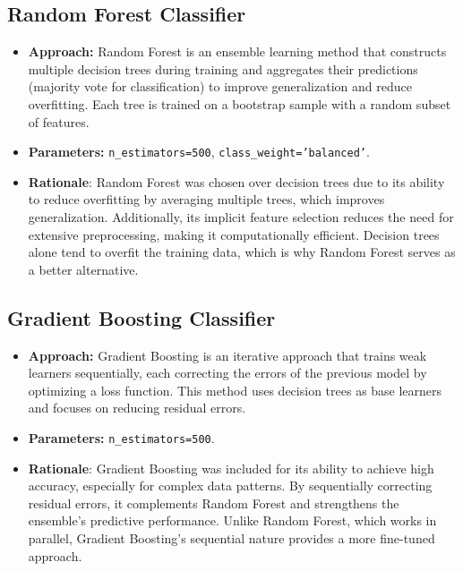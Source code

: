 \documentclass{article}
\begin{document}
\subsection{Random Forest Classifier}
\begin{itemize}
    \item \textbf{Approach:} Random Forest is an ensemble learning method that constructs multiple decision trees during training and aggregates their predictions (majority vote for classification) to improve generalization and reduce overfitting. Each tree is trained on a bootstrap sample with a random subset of features.
    \item \textbf{Parameters:} \texttt{n\_estimators=500}, \texttt{class\_weight='balanced'}.
    \item \textbf{Rationale}: Random Forest was chosen over decision trees due to its ability to reduce overfitting by averaging multiple trees, which improves generalization. Additionally, its implicit feature selection reduces the need for extensive preprocessing, making it computationally efficient. Decision trees alone tend to overfit the training data, which is why Random Forest serves as a better alternative.
\end{itemize}

\subsection{Gradient Boosting Classifier}
\begin{itemize}
    \item \textbf{Approach:} Gradient Boosting is an iterative approach that trains weak learners sequentially, each correcting the errors of the previous model by optimizing a loss function. This method uses decision trees as base learners and focuses on reducing residual errors.
    \item \textbf{Parameters:} \texttt{n\_estimators=500}.
    \item \textbf{Rationale}: Gradient Boosting was included for its ability to achieve high accuracy, especially for complex data patterns. By sequentially correcting residual errors, it complements Random Forest and strengthens the ensemble's predictive performance. Unlike Random Forest, which works in parallel, Gradient Boosting’s sequential nature provides a more fine-tuned approach.
\end{itemize}
\end{document}
